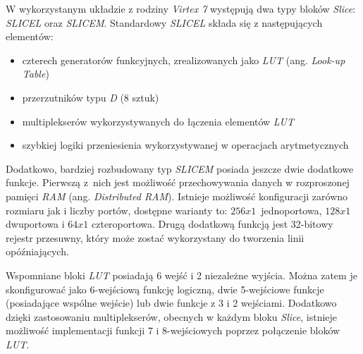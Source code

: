 W wykorzystanym układzie z rodziny \textit{Virtex 7} występują dwa typy bloków \textit{Slice}: \textit{SLICEL} oraz \textit{SLICEM}. Standardowy \textit{SLICEL} składa się z następujących elementów:
    \begin{itemize}[itemsep=-1ex]
    \item czterech generatorów funkcyjnych, zrealizowanych jako \textit{LUT} (ang. \textit{Look-up Table})
    \item przerzutników typu \textit{D} (8 sztuk)
    \item multiplekserów wykorzystywanych do łączenia elementów \textit{LUT}
    \item szybkiej logiki przeniesienia wykorzystywanej w operacjach arytmetycznych
    \end{itemize}   

Dodatkowo, bardziej rozbudowany typ \textit{SLICEM} posiada jeszcze dwie dodatkowe funkcje. 
Pierwszą z~nich jest możliwość przechowywania danych w rozproszonej pamięci \textit{RAM} (ang. \textit{Distributed RAM}). 
Istnieje możliwość konfiguracji zarówno rozmiaru jak i liczby portów, dostępne warianty to: $256x1$~jednoportowa, $128x1$ dwuportowa i $64x1$ czteroportowa. 
Drugą dodatkową funkcją jest 32-bitowy rejestr przesuwny, który może zostać wykorzystany do tworzenia linii opóźniających.

Wspomniane bloki \textit{LUT} posiadają 6 wejść i 2 niezależne wyjścia. 
Można zatem je skonfigurować jako 6-wejściową funkcję logiczną, dwie 5-wejściowe funkcje (posiadające wspólne wejście) lub dwie funkcje z 3 i 2 wejściami. 
Dodatkowo dzięki zastosowaniu multiplekserów, obecnych w każdym bloku \textit{Slice}, istnieje możliwość implementacji funkcji 7 i 8-wejściowych poprzez połączenie bloków \textit{LUT}.

